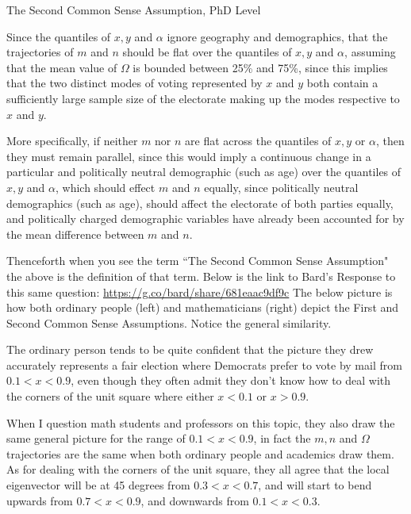 \begin{definition}{The Second Common Sense Assumption, PhD Level}

Since the quantiles of $x,y$ and $\alpha$ ignore geography and demographics, that the trajectories of $m$ and $n$ should be flat over the quantiles of $x,y$ and $\alpha$, assuming that the mean value of $\Omega$ is bounded between 25\% and 75\%, since this implies that the two distinct modes of voting represented by $x$ and $y$ both contain a sufficiently large sample size of the electorate making up the modes respective to $x$ and $y$. 

More specifically, if neither $m$ nor $n$ are flat across the quantiles of $x,y$ or $\alpha$, then they must remain parallel, since this would imply a continuous change in a particular and politically neutral demographic (such as age) over the quantiles of $x,y$ and $\alpha$, which should effect $m$ and $n$ equally, since politically neutral demographics (such as age), should affect the electorate of both parties equally, and politically charged demographic variables have already been accounted for by the mean difference between $m$ and $n$.
\end{definition}
Thenceforth when you see the term ``The Second Common Sense Assumption" the above is the definition of that term. Below is the link to Bard's Response to this same question: \url{https://g.co/bard/share/681eaac9df9c}
\newpage
The below picture is how both ordinary people (left) and mathematicians (right) depict the First and Second Common Sense Assumptions. Notice the general similarity.

The ordinary person tends to be quite confident that the picture they drew accurately represents a fair election where Democrats prefer to vote by mail from $0.1<x<0.9$, even though they often admit they don't know how to deal with the corners of the unit square where either $x<0.1$ or $x>0.9$.

When I question math students and professors on this topic, they also draw the same general picture for the range of $0.1<x<0.9$, in fact the $m,n$ and $\Omega$ trajectories are the same when both ordinary people and academics draw them. As for dealing with the corners of the unit square,  they all agree that the local eigenvector will be at 45 degrees from $0.3<x<0.7$, and will start to bend upwards from $0.7<x<0.9$, and downwards from $0.1<x<0.3$. 

